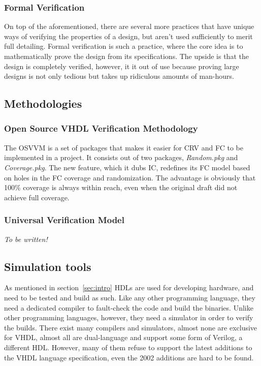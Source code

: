 \documentclass[11pt,british]{article}
\begin{document}
\subsubsection{Formal Verification}
On top of the aforementioned, there are several more practices that have unique ways of verifying the properties of a design, but aren't used sufficiently to merit full detailing. Formal verification is such a practice, where the core idea is to mathematically prove the design from its specifications. The upside is that the design is completely verified, however, it it out of use because proving large designs is not only tedious but takes up ridiculous amounts of man-hours.

\subsection{Methodologies}

\subsubsection{Open Source VHDL Verification Methodology}
The \gls{OSVVM} is a set of packages that makes it easier for \gls{CRV} and \gls{FC} to be implemented in a project. It consists out of two packages, \emph{Random.pkg} and \emph{Coverage.pkg}. The new feature, which it dubs \gls{IC}, redefines its FC model based on holes in the FC coverage and randomization. The advantage is obviously that 100\% coverage is always within reach, even when the original draft did not achieve full coverage.\cite{ICoverage}

\subsubsection{Universal Verification Model}
\emph{\color{red} To be written!}

\subsection{Simulation tools}
As mentioned in section~\ref{sec:intro} \gls{HDL}s are used for developing hardware, and need to be tested and build as such. Like any other programming language, they need a dedicated compiler to fault-check the code and build the binaries. Unlike other programming languages, however, they need a simulator in order to verify the builds. There exist many compilers and simulators, almost none are exclusive for \gls{VHDL}, almost all are dual-language and support some form of Verilog, a different HDL. However, many of them refuse to support the latest additions to the VHDL language specification, even the 2002 additions are hard to be found.
\end{document}
